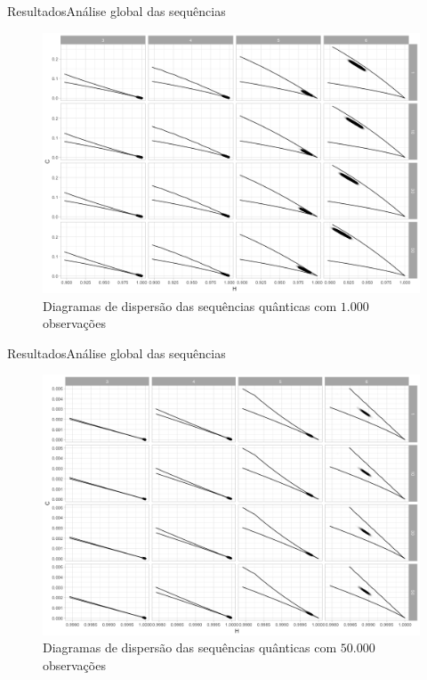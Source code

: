\documentclass[10pt,xcolor={dvipsnames}]{beamer}
\begin{document}
\begin{frame}{Resultados}{Análise global das sequências}
	\begin{figure}[hbt]
		\centering
		\includegraphics[width=.9\linewidth]{ScatterAll_Quant_1k}
		\caption{Diagramas de dispersão das sequências quânticas com $1.000$ observações} %
	\end{figure}
\end{frame}

\begin{frame}{Resultados}{Análise global das sequências}
	\begin{figure}[hbt]
		\centering
		\includegraphics[width=.9\linewidth]{ScatterAll_Quant_50k}
		\caption{Diagramas de dispersão das sequências quânticas com $50.000$ observações} %
	\end{figure}
\end{frame}
\end{document}
